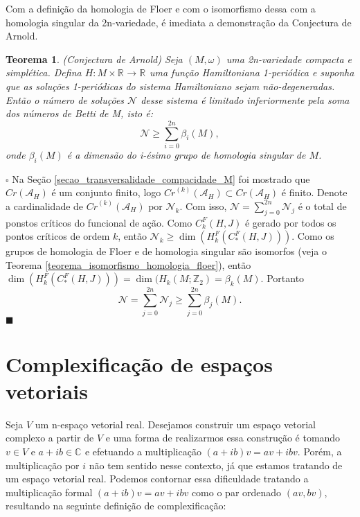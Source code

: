 \documentclass[12pt]{book}
\newtheorem{teorema}{Teorema}[section]
\newenvironment{prova}[1]{$\square$ #1}{\hfill$\blacksquare$}
\newcommand{\complexo}[1]{\mathbb{C}^{#1}}
\newcommand{\funcionalH}{\mathcal{A}_{H}}
\newcommand{\inteiros}{\mathbb{Z}}
\newcommand{\pontoscriticos}[1]{\textit{Cr}(#1)}
\newcommand{\pontoscriticosordem}[2]{\textit{Cr}^{(#1)}(#2)}
\newcommand{\real}[1]{\mathbb{R}^{#1}}
\newcommand{\reta}{\real{}}
\begin{document}
	Com a definição da homologia de Floer e com o isomorfismo dessa com a homologia singular da 2n-variedade, é imediata a demonstração da Conjectura de Arnold.
	
	\begin{teorema}
			(Conjectura de Arnold) Seja $(M,\omega)$ uma 2n-variedade compacta e simplética. Defina $H:M\times \real{} \to \reta$ uma função Hamiltoniana 1-periódica e suponha que as soluções 1-periódicas do sistema Hamiltoniano sejam não-degeneradas. Então o número de soluções $\mathcal{N}$ desse sistema é limitado inferiormente pela soma dos números de Betti de M, isto é:
				$$
				\mathcal{N}\geq \sum_{i=0}^{2n}\beta_{i}(M),
				$$
				onde $\beta_{i}(M)$ é a dimensão do i-ésimo grupo de homologia singular de $M$.
	\end{teorema}
	\begin{prova}
		Na Seção \ref{secao_transversalidade_compacidade_M} foi mostrado que $\pontoscriticos{\funcionalH}$ é um conjunto finito, logo $\pontoscriticosordem{k}{\funcionalH} \subset \pontoscriticos{\funcionalH}$ é finito. Denote a cardinalidade de $\pontoscriticosordem{k}{\funcionalH}$ por $\mathcal{N}_{k}$. Com isso, $\mathcal{N} =\sum_{j=0}^{2n} \mathcal{N}_{j}$ é o total de ponstos críticos do funcional de ação. Como $C^{F}_{k}(H,J)$ é gerado por todos os pontos críticos de ordem $k$, então $\mathcal{N}_{k}\geq \dim(	H^{F}_{k}(C^{F}_{*}(H,J)))$. Como os grupos de homologia de Floer e de homologia singular são isomorfos (veja o Teorema \ref{teorema_isomorfismo_homologia_floer}), então $\dim(	H^{F}_{k}(C^{F}_{*}(H,J)))  = \dim(	H_{k}(M;\inteiros_{2}) = \beta_{k}(M)$. Portanto
		$$
		\mathcal{N} =\sum_{j=0}^{2n} \mathcal{N}_{j} \geq \sum_{j=0}^{2n} \beta_{j}(M).
		$$ 
	\end{prova}
	
	\appendix
	
	\chapter{Complexificação de espaços vetoriais}\label{apendice_complexificacao_espacos_vetoriais}
	
	Seja $V$ um n-espaço vetorial real. Desejamos construir um espaço vetorial complexo a partir de $V$ e uma forma de realizarmos essa construção é tomando $v \in V $ e $a+ib \in \complexo{}$ e efetuando a multiplicação $(a+ib)v = av+ibv$. Porém, a multiplicação por $i$ não tem sentido nesse contexto, já que estamos tratando de um espaço vetorial real. Podemos contornar essa dificuldade tratando a multiplicação formal $(a+ib)v = av+ibv$ como o par ordenado $(av, bv)$, resultando na seguinte definição de complexificação:
	
\end{document}
